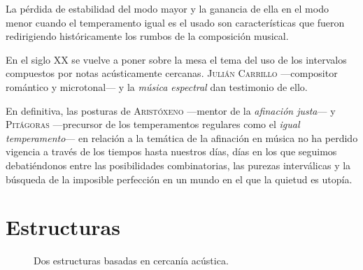 \documentclass[a4paper,11pt]{article}
\begin{document}
\begin{multicols}{2}
  La pérdida de estabilidad del modo mayor y la ganancia de ella en el modo menor cuando el temperamento igual es el usado son características que fueron redirigiendo históricamente los rumbos de la composición musical.

  En el siglo XX se vuelve a poner sobre la mesa el tema del uso de los intervalos compuestos por notas acústicamente cercanas. \textsc{Julián Carrillo} ---compositor romántico y microtonal--- y la \emph{música espectral} dan testimonio de ello.

  En definitiva, las posturas de \textsc{Aristóxeno} ---mentor de la \emph{afinación justa}--- y \textsc{Pitágoras} ---precursor de los temperamentos regulares como el \emph{igual temperamento}--- en relación a la temática de la afinación en música no ha perdido vigencia a través de los tiempos hasta nuestros días, días en los que seguimos debatiéndonos entre las posibilidades combinatorias, las purezas interválicas y la búsqueda de la imposible perfección en un mundo en el que la quietud es utopía.
\end{multicols}

\section{Estructuras}\label{sec:estructuras}
\begin{figure}[ht]
\centering
{}
\caption{Dos estructuras basadas en cercanía acústica.}\label{fig:dos-estructuras}
\end{figure}
\end{document}
